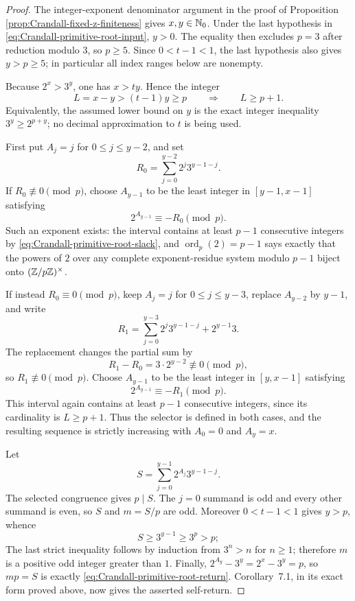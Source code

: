 \begin{proof}
The integer-exponent denominator argument in the proof of Proposition~
\ref{prop:Crandall-fixed-z-finiteness} gives $x,y\in\mathbb{N}_{0}$.  Under the last
hypothesis in \eqref{eq:Crandall-primitive-root-input}, $y>0$.  The equality
then excludes $p=3$ after reduction modulo $3$, so $p\geq5$.  Since
$0<t-1<1$, the last hypothesis also gives $y>p\geq5$; in particular all
index ranges below are nonempty.

Because $2^x>3^y$, one has $x>ty$.  Hence the integer
\begin{equation}
\label{eq:Crandall-primitive-root-slack}
 L=x-y>(t-1)y\geq p
 \qquad\Longrightarrow\qquad L\geq p+1.
\end{equation}
Equivalently, the assumed lower bound on $y$ is the exact integer inequality
$3^y\geq2^{p+y}$; no decimal approximation to $t$ is being used.

First put $A_j=j$ for $0\leq j\leq y-2$, and set
\[
 R_0=\sum_{j=0}^{y-2}2^j3^{y-1-j}.
\]
If $R_0\not\equiv0\pmod p$, choose $A_{y-1}$ to be the least integer in
$[y-1,x-1]$ satisfying
\begin{equation}
\label{eq:Crandall-primitive-root-selector-first}
 2^{A_{y-1}}\equiv-R_0\pmod p.
\end{equation}
Such an exponent exists: the interval contains at least $p-1$ consecutive
integers by \eqref{eq:Crandall-primitive-root-slack}, and
\(\operatorname{ord}_p(2)=p-1\) says exactly that the powers of $2$ over any
complete exponent-residue system modulo $p-1$ biject onto
\((\mathbb{Z}/p\mathbb{Z})^\times\).

If instead $R_0\equiv0\pmod p$, keep $A_j=j$ for $0\leq j\leq y-3$, replace
$A_{y-2}$ by $y-1$, and write
\[
 R_1=\sum_{j=0}^{y-3}2^j3^{y-1-j}+2^{y-1}3.
\]
The replacement changes the partial sum by
\[
 R_1-R_0=3\cdot2^{y-2}\not\equiv0\pmod p,
\]
so $R_1\not\equiv0\pmod p$.  Choose $A_{y-1}$ to be the least integer in
$[y,x-1]$ satisfying
\begin{equation}
\label{eq:Crandall-primitive-root-selector-second}
 2^{A_{y-1}}\equiv-R_1\pmod p.
\end{equation}
This interval again contains at least $p-1$ consecutive integers, since its
cardinality is $L\geq p+1$.  Thus the selector is defined in both cases, and
the resulting sequence is strictly increasing with $A_0=0$ and $A_y=x$.

Let
\[
 S=\sum_{j=0}^{y-1}2^{A_j}3^{y-1-j}.
\]
The selected congruence gives $p\mid S$.  The $j=0$ summand is odd and every
other summand is even, so $S$ and $m=S/p$ are odd.  Moreover $0<t-1<1$
gives $y>p$, whence
\[
 S\geq3^{y-1}\geq3^p>p;
\]
The last strict inequality follows by induction from $3^n>n$ for $n\geq1$;
therefore $m$ is a positive odd integer greater than $1$.  Finally,
$2^{A_y}-3^y=2^x-3^y=p$, so $mp=S$ is exactly
\eqref{eq:Crandall-primitive-root-return}.  Corollary~7.1, in its exact form
proved above, now gives the asserted self-return.
\end{proof}

